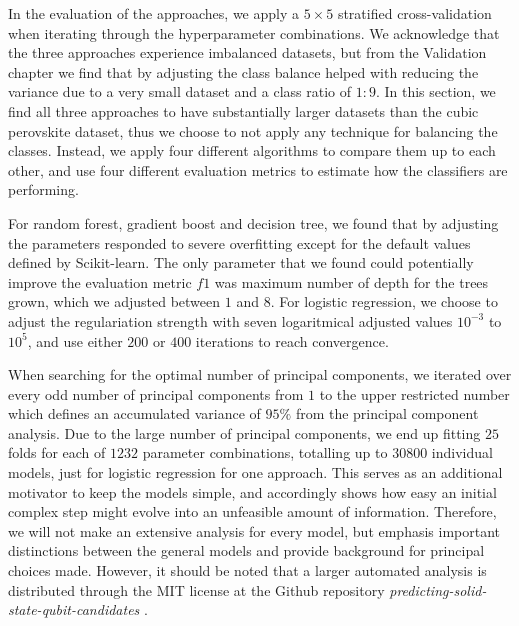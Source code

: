 In the evaluation of the approaches, we apply a $5\times 5$ stratified cross-validation when iterating through the hyperparameter combinations. We acknowledge that the three approaches experience imbalanced datasets, but from the Validation chapter we find that by adjusting the class balance helped with reducing the variance due to a very small dataset and a class ratio of $1:9$. In this section, we find all three approaches to have substantially larger datasets than the cubic perovskite dataset, thus we choose to not apply any technique for balancing the classes. Instead, we apply four different algorithms to compare them up to each other, and use four different evaluation metrics to estimate how the classifiers are performing. %

For random forest, gradient boost and decision tree, we found that by adjusting the parameters responded to severe overfitting except for the default values defined by Scikit-learn. The only parameter that we found could potentially improve the evaluation metric $f1$ was maximum number of depth for the trees grown, which we adjusted between $1$ and $8$. For logistic regression, we choose to adjust the regulariation strength with seven logaritmical adjusted values $10^{-3}$ to $10^{5}$, and use either $200$ or $400$ iterations to reach convergence.

When searching for the optimal number of principal components, we iterated over every odd number of principal components from $1$ to the upper restricted number which defines an accumulated variance of $95\%$ from the principal component analysis. Due to the large number of principal components, we end up fitting $25$ folds for each of $1232$ parameter combinations, totalling up to $30800$ individual models, just for logistic regression for one approach. This serves as an additional motivator to keep the models simple, and accordingly shows how easy an initial complex step might evolve into an unfeasible amount of information. Therefore, we will not make an extensive analysis for every model, but emphasis important distinctions between the general models and provide background for principal choices made. However, it should be noted that a larger automated analysis is distributed through the MIT license at the Github repository \textit{predicting-solid-state-qubit-candidates} \cite{Ohebbi2021}.

